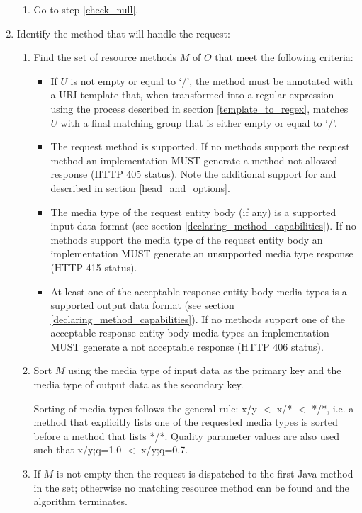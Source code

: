 \begin{enumerate}
\begin{enumerate}
\item Go to step \ref{check_null}.

\end{enumerate}

\item \label{find_method} Identify the method that will handle the request:

\begin{enumerate}
\item Find the set of resource methods $M$ of $O$ that meet the following criteria:
\begin{itemize}
\item If $U$ is not empty or equal to \lq/\rq, the method must be annotated with  a URI template that, when transformed into a regular expression using the process described in section \ref{template_to_regex}, matches $U$ with a final matching group that is either empty or equal to \lq/\rq.
\item The request method is supported. If no methods support the request method an implementation MUST generate a method not allowed response (HTTP 405 status). Note the additional support for  and  described in section \ref{head_and_options}.
\item The media type of the request entity body (if any) is a supported input data format (see section \ref{declaring_method_capabilities}). If no methods support the media type of the request entity body an implementation MUST generate an unsupported media type response (HTTP 415 status).
\item At least one of the acceptable response entity body media types is a supported output data format (see section \ref{declaring_method_capabilities}). If no methods support one of the acceptable response entity body media types an implementation MUST generate a not acceptable response (HTTP 406 status).
\end{itemize} 
\item Sort $M$ using the media type of input data as the primary key and the media type of output data as the secondary key.

Sorting of media types follows the general rule: x/y $<$ x/* $<$ */*, i.e. a method that explicitly lists one of the requested media types is sorted before a method that lists */*. Quality parameter values are also used such that x/y;q=1.0 $<$ x/y;q=0.7.

\item \label{dispatch_method} If $M$ is not empty then the request is dispatched to the first Java method in the set; otherwise no matching resource method can be found and the algorithm terminates.
\end{enumerate}

\end{enumerate}

